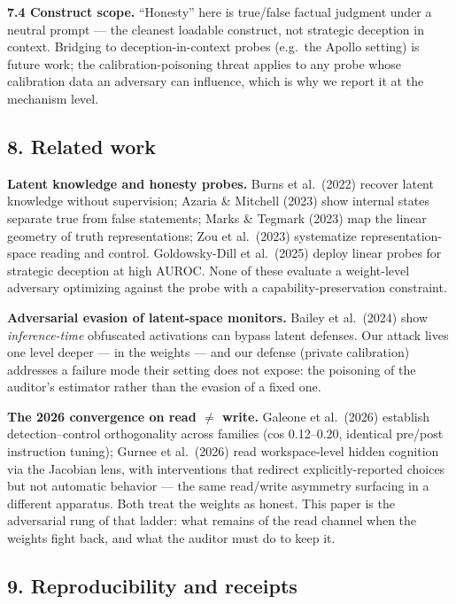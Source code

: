 \documentclass[
  11pt,
]{article}
\begin{document}
\textbf{7.4 Construct scope.} ``Honesty'' here is true/false factual
judgment under a neutral prompt --- the cleanest loadable construct, not
strategic deception in context. Bridging to deception-in-context probes
(e.g.~the Apollo setting) is future work; the calibration-poisoning
threat applies to any probe whose calibration data an adversary can
influence, which is why we report it at the mechanism level.

\subsection{8. Related work}\label{related-work}

\textbf{Latent knowledge and honesty probes.} Burns et al.~(2022)
recover latent knowledge without supervision; Azaria \& Mitchell (2023)
show internal states separate true from false statements; Marks \&
Tegmark (2023) map the linear geometry of truth representations; Zou et
al.~(2023) systematize representation-space reading and control.
Goldowsky-Dill et al.~(2025) deploy linear probes for strategic
deception at high AUROC. None of these evaluate a weight-level adversary
optimizing against the probe with a capability-preservation constraint.

\textbf{Adversarial evasion of latent-space monitors.} Bailey et
al.~(2024) show \emph{inference-time} obfuscated activations can bypass
latent defenses. Our attack lives one level deeper --- in the weights
--- and our defense (private calibration) addresses a failure mode their
setting does not expose: the poisoning of the auditor's estimator rather
than the evasion of a fixed one.

\textbf{The 2026 convergence on read $\neq$ write.} Galeone et al.~(2026)
establish detection--control orthogonality across families (cos
0.12--0.20, identical pre/post instruction tuning); Gurnee et al.~(2026)
read workspace-level hidden cognition via the Jacobian lens, with
interventions that redirect explicitly-reported choices but not
automatic behavior --- the same read/write asymmetry surfacing in a
different apparatus. Both treat the weights as honest. This paper is the
adversarial rung of that ladder: what remains of the read channel when
the weights fight back, and what the auditor must do to keep it.

\subsection{9. Reproducibility and
receipts}\label{reproducibility-and-receipts}
\end{document}
